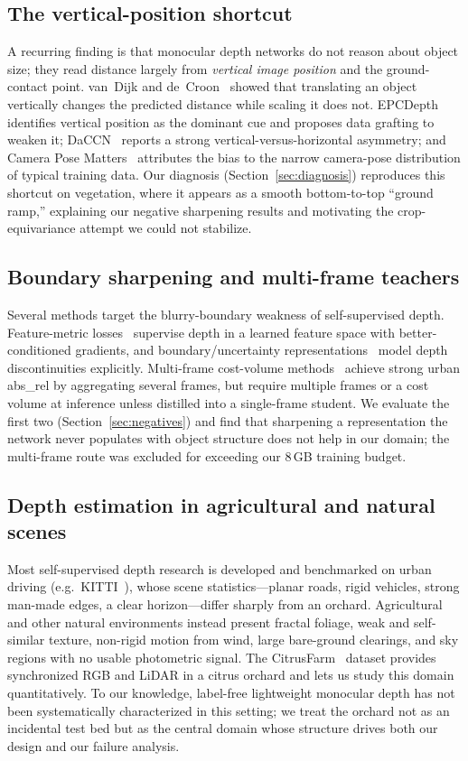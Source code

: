 \documentclass[conference]{IEEEtran}
\begin{document}
\subsection{The vertical-position shortcut}
A recurring finding is that monocular depth networks do not reason about object size;
they read distance largely from \emph{vertical image position} and the ground-contact
point. van~Dijk and de~Croon~\cite{vandijk2019howdo} showed that translating an object
vertically changes the predicted distance while scaling it does not.
EPCDepth~\cite{peng2021epcdepth} identifies vertical position as the dominant cue and
proposes data grafting to weaken it; DaCCN~\cite{han2023daccn} reports a strong
vertical-versus-horizontal asymmetry; and Camera Pose
Matters~\cite{zhao2021camerapose} attributes the bias to the narrow camera-pose
distribution of typical training data. Our diagnosis
(Section~\ref{sec:diagnosis}) reproduces this shortcut on vegetation, where it appears
as a smooth bottom-to-top ``ground ramp,'' explaining our negative sharpening results
and motivating the crop-equivariance attempt we could not stabilize.

\subsection{Boundary sharpening and multi-frame teachers}
Several methods target the blurry-boundary weakness of self-supervised depth.
Feature-metric losses~\cite{shu2020featdepth} supervise depth in a learned feature
space with better-conditioned gradients, and boundary/uncertainty
representations~\cite{tsob2025} model depth discontinuities explicitly. Multi-frame
cost-volume methods~\cite{watson2021manydepth} achieve strong urban abs\_rel by
aggregating several frames, but require multiple frames or a cost volume at inference
unless distilled into a single-frame student. We evaluate the first two
(Section~\ref{sec:negatives}) and find that sharpening a representation the network
never populates with object structure does not help in our domain; the multi-frame
route was excluded for exceeding our 8\,GB training budget.

\subsection{Depth estimation in agricultural and natural scenes}
Most self-supervised depth research is developed and benchmarked on urban driving
(e.g.\ KITTI~\cite{geiger2013kitti}), whose scene statistics---planar roads, rigid
vehicles, strong man-made edges, a clear horizon---differ sharply from an orchard.
Agricultural and other natural environments instead present fractal foliage, weak and
self-similar texture, non-rigid motion from wind, large bare-ground clearings, and
sky regions with no usable photometric signal. The CitrusFarm~\cite{citrusfarm}
dataset provides synchronized RGB and LiDAR in a citrus orchard and lets us study this
domain quantitatively. To our knowledge, label-free lightweight monocular depth has
not been systematically characterized in this setting; we treat the orchard not as an
incidental test bed but as the central domain whose structure drives both our design
and our failure analysis.
\end{document}

